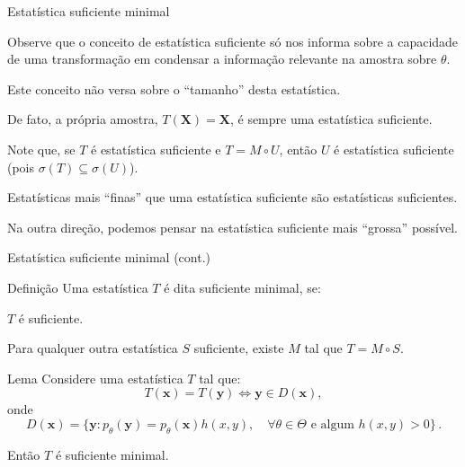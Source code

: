 \documentclass[11pt]{beamer}
\newenvironment{halfwideitemize}{\itemize\addtolength{\itemsep}{0.5em}}{\enditemize}
\newenvironment{halfwideenumerate}{\enumerate\addtolength{\itemsep}{0.5em}}{\endenumerate}
\begin{document}
	\begin{frame}{Estatística suficiente minimal}
		\begin{halfwideitemize}
			\item Observe que o conceito de estatística suficiente só nos informa sobre a capacidade de uma transformação em condensar a informação relevante na amostra sobre $\theta$.
			\item Este conceito não versa sobre o ``tamanho'' desta estatística.
			\begin{halfwideitemize}
				\item De fato, a própria amostra, $T(\boldsymbol{X})=\boldsymbol{X}$, é sempre uma estatística suficiente.
			\end{halfwideitemize}
			\item Note que, se $T$ é estatística suficiente e $T = M\circ U$, então $U$ é estatística suficiente (pois $\sigma(T)\subseteq \sigma(U)$).
			\begin{halfwideitemize}
				\item Estatísticas mais ``finas'' que uma estatística suficiente são estatísticas suficientes.
			\end{halfwideitemize}
			\item Na outra direção, podemos pensar na estatística suficiente mais ``grossa'' possível. 
		\end{halfwideitemize}
	\end{frame}
	\begin{frame}{Estatística suficiente minimal (cont.)}
		\begin{block}{Definição}
			Uma estatística $T$ é dita suficiente minimal, se:
			\begin{halfwideenumerate}
				\item $T$ é suficiente.
				\item Para qualquer outra estatística $S$ suficiente, existe $M$ tal que $T = M \circ S$.
			\end{halfwideenumerate}
		\end{block}
		\begin{block}{Lema}
			Considere uma estatística $T$ tal que:
			$$T(\boldsymbol{x}) = T(\boldsymbol{y}) \iff \boldsymbol{y} \in D(\boldsymbol{x}) , $$
			onde
			$$D(\boldsymbol{x}) = \{\boldsymbol{y}:  p_\theta(\boldsymbol{y}) = p_\theta(\boldsymbol{x}) h(x,y), \quad \forall \theta \in \Theta  \text{ e algum } h(x,y) > 0\}\, .$$
			
			Então $T$ é suficiente minimal.
		\end{block}
	\end{frame}
\end{document}
